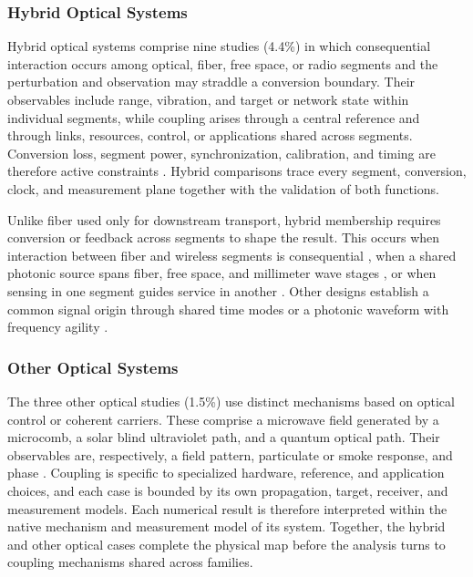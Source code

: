 \subsubsection{Hybrid Optical Systems}

Hybrid optical systems comprise nine studies (4.4\%) in which consequential
interaction occurs among optical, fiber, free space, or radio segments and the
perturbation and observation may straddle a conversion boundary. Their
observables include range, vibration, and target or network state within
individual segments, while coupling arises through a central reference and
through links, resources, control, or applications shared across segments.
Conversion loss, segment power, synchronization, calibration, and timing are
therefore active constraints
\cite{OISAC_SCR00210,OISAC_SCR00366,OISAC_SCR00277}. Hybrid comparisons trace
every segment, conversion, clock, and measurement plane together with the
validation of both functions.

Unlike fiber used only for downstream transport, hybrid membership requires
conversion or feedback across segments to shape the result. This occurs when
interaction between fiber and wireless segments is consequential
\cite{OISAC_SCR00210,OISAC_SCR00366}, when a shared photonic source spans fiber,
free space, and millimeter wave stages \cite{OISAC_SCR00944}, or when sensing in
one segment guides service in another \cite{OISAC_SCR01011,OISAC_SCR00277}.
Other designs establish a common signal origin through shared time modes or a
photonic waveform with frequency agility
\cite{OISAC_SCR00091,OISAC_SCR01229}.

\subsubsection{Other Optical Systems}

The three other optical studies (1.5\%) use distinct mechanisms based on optical
control or coherent carriers. These comprise a microwave field generated by a
microcomb, a solar blind ultraviolet path, and a quantum optical path. Their
observables are,
respectively, a field pattern, particulate or smoke response, and phase
\cite{OISAC_SCR00268,OISAC_SCR00379,OISAC_SCR00906}. Coupling is specific to
specialized hardware, reference, and application choices, and each case is
bounded by its own propagation, target, receiver, and measurement models.
Each numerical result is therefore interpreted within the native mechanism and
measurement model of its system. Together, the hybrid and other optical cases
complete the physical map before the analysis turns to coupling mechanisms
shared across families.

